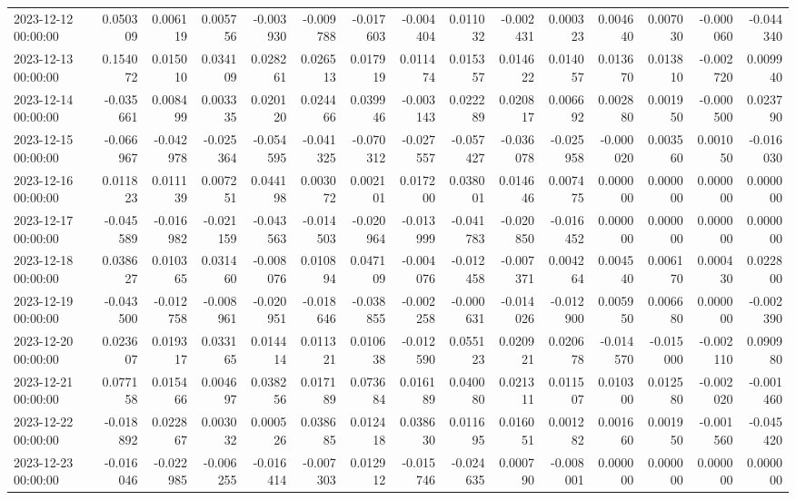 \begin{tabular}{lrrrrrrrrrrrrrr}
2023-12-12 00:00:00 & 0.050309 & 0.006119 & 0.005756 & -0.003930 & -0.009788 & -0.017603 & -0.004404 & 0.011032 & -0.002431 & 0.000323 & 0.004640 & 0.007030 & -0.000060 & -0.044340 \\
2023-12-13 00:00:00 & 0.154072 & 0.015010 & 0.034109 & 0.028261 & 0.026513 & 0.017919 & 0.011474 & 0.015357 & 0.014622 & 0.014057 & 0.013670 & 0.013810 & -0.002720 & 0.009940 \\
2023-12-14 00:00:00 & -0.035661 & 0.008499 & 0.003335 & 0.020120 & 0.024466 & 0.039946 & -0.003143 & 0.022289 & 0.020817 & 0.006692 & 0.002880 & 0.001950 & -0.000500 & 0.023790 \\
2023-12-15 00:00:00 & -0.066967 & -0.042978 & -0.025364 & -0.054595 & -0.041325 & -0.070312 & -0.027557 & -0.057427 & -0.036078 & -0.025958 & -0.000020 & 0.003560 & 0.001050 & -0.016030 \\
2023-12-16 00:00:00 & 0.011823 & 0.011139 & 0.007251 & 0.044198 & 0.003072 & 0.002101 & 0.017200 & 0.038001 & 0.014646 & 0.007475 & 0.000000 & 0.000000 & 0.000000 & 0.000000 \\
2023-12-17 00:00:00 & -0.045589 & -0.016982 & -0.021159 & -0.043563 & -0.014503 & -0.020964 & -0.013999 & -0.041783 & -0.020850 & -0.016452 & 0.000000 & 0.000000 & 0.000000 & 0.000000 \\
2023-12-18 00:00:00 & 0.038627 & 0.010365 & 0.031460 & -0.008076 & 0.010894 & 0.047109 & -0.004076 & -0.012458 & -0.007371 & 0.004264 & 0.004540 & 0.006170 & 0.000430 & 0.022800 \\
2023-12-19 00:00:00 & -0.043500 & -0.012758 & -0.008961 & -0.020951 & -0.018646 & -0.038855 & -0.002258 & -0.000631 & -0.014026 & -0.012900 & 0.005950 & 0.006680 & 0.000000 & -0.002390 \\
2023-12-20 00:00:00 & 0.023607 & 0.019317 & 0.033165 & 0.014414 & 0.011321 & 0.010638 & -0.012590 & 0.055123 & 0.020921 & 0.020678 & -0.014570 & -0.015000 & -0.002110 & 0.090980 \\
2023-12-21 00:00:00 & 0.077158 & 0.015466 & 0.004697 & 0.038256 & 0.017189 & 0.073684 & 0.016189 & 0.040080 & 0.021311 & 0.011507 & 0.010300 & 0.012580 & -0.002020 & -0.001460 \\
2023-12-22 00:00:00 & -0.018892 & 0.022867 & 0.003032 & 0.000526 & 0.038685 & 0.012418 & 0.038630 & 0.011695 & 0.016051 & 0.001282 & 0.001660 & 0.001950 & -0.001560 & -0.045420 \\
2023-12-23 00:00:00 & -0.016046 & -0.022985 & -0.006255 & -0.016414 & -0.007303 & 0.012912 & -0.015746 & -0.024635 & 0.000790 & -0.008001 & 0.000000 & 0.000000 & 0.000000 & 0.000000 \\

\end{tabular}
